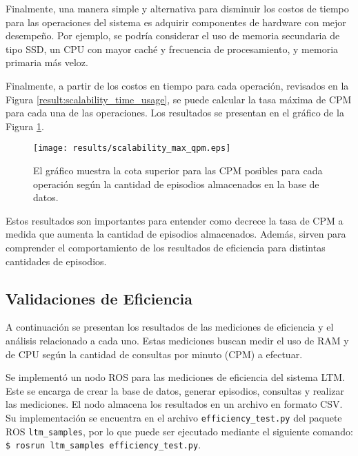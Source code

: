 Finalmente, una manera simple y alternativa para disminuir los costos de tiempo para las operaciones del sistema es adquirir componentes de hardware con mejor desempeño. Por ejemplo, se podría considerar el uso de memoria secundaria de tipo SSD, un CPU con mayor caché y frecuencia de procesamiento, y memoria primaria más veloz.

 Finalmente, a partir de los costos en tiempo para cada operación, revisados en la Figura \ref{result:scalability_time_usage}, se puede calcular la tasa máxima de CPM para cada una de las operaciones. Los resultados se presentan en el gráfico de la Figura \ref{result:scalability_max_qpm}. 

\begin{figure}[!ht]
	\centering
	\texttt{[image: results/scalability\_max\_qpm.eps]}
	\caption[Escalabilidad: Cota superior para las CPM de cada operación.]
	{\small El gráfico muestra la cota superior para las CPM posibles para cada operación según la cantidad de episodios almacenados en la base de datos.}
	\label{result:scalability_max_qpm}
\end{figure}

Estos resultados son importantes para entender como decrece la tasa de CPM a medida que aumenta la cantidad de episodios almacenados. Además, sirven para comprender el comportamiento de los resultados de eficiencia para distintas cantidades de episodios.



\subsection{Validaciones de Eficiencia}

A continuación se presentan los resultados de las mediciones de eficiencia y el análisis relacionado a cada uno. Estas mediciones buscan medir el uso de RAM y de CPU según la cantidad de consultas por minuto (CPM) a efectuar.

 Se implementó un nodo ROS para las mediciones de eficiencia del sistema LTM. Este se encarga de crear la base de datos, generar episodios, consultas y realizar las mediciones. El nodo almacena los resultados en un archivo en formato CSV. Su implementación se encuentra en el archivo \texttt{efficiency\_test.py} del paquete ROS \texttt{ltm\_samples}, por lo que puede ser ejecutado mediante el siguiente comando: \texttt{\$ rosrun ltm\_samples efficiency\_test.py}.

